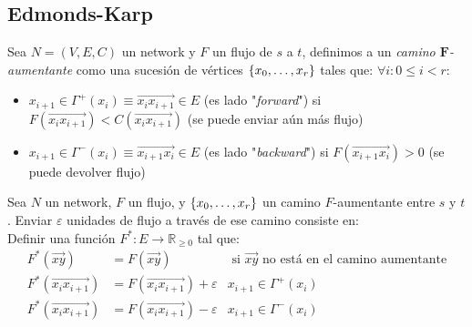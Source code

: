 \subsection{Edmonds-Karp}

\begin{definition}
Sea $N = (V,E,C)$ un network y $F$ un flujo de $s$ a $t$, definimos a un \emph{camino $\boldsymbol{F}$-aumentante} como una sucesión de vértices $\{x_0,\mathellipsis, x_r\}$ tales que: $\forall i: 0 \le i < r :$
\begin{itemize}
    \item
    $x_{i+1} \in \Gamma^{+}(x_i) \equiv \overrightarrow{x_i x_{i+1}} \in E$ (es lado "\emph{forward}") si $F(\overrightarrow{x_i x_{i+1}}) < C(\overrightarrow{x_i x_{i+1}})$ (se puede enviar aún más flujo)
    \item
    $x_{i+1} \in \Gamma^{-}(x_i) \equiv \overrightarrow{x_{i+1} x_i} \in E$ (es lado "\emph{backward}") si $F(\overrightarrow{x_{i+1} x_i}) > 0$ (se puede devolver flujo)
\end{itemize}
\end{definition}

\begin{definition}
Sea $N$ un network, $F$ un flujo, y $\{x_0,\mathellipsis,x_r\}$ un camino $F$-aumentante entre $s$ y $t$. Enviar $\varepsilon$ unidades de flujo a través de ese camino consiste en:\\
Definir una función $F^* \colon E \to \mathbb{R}_{\ge 0}$ tal que:
\begin{align}
    F^*(\overrightarrow{xy}) &= F(\overrightarrow{xy}) &\text{ si $\overrightarrow{xy}$ no está en el camino aumentante} \\
    F^*(\overrightarrow{x_i x_{i+1}}) &= F(\overrightarrow{x_i x_{i+1}}) + \varepsilon & x_{i+1} \in \Gamma^{+}(x_i) \\
    F^*(\overrightarrow{x_i x_{i+1}}) &= F(\overrightarrow{x_i x_{i+1}}) - \varepsilon & x_{i+1} \in \Gamma^{-}(x_i)
\end{align}
\end{definition}

